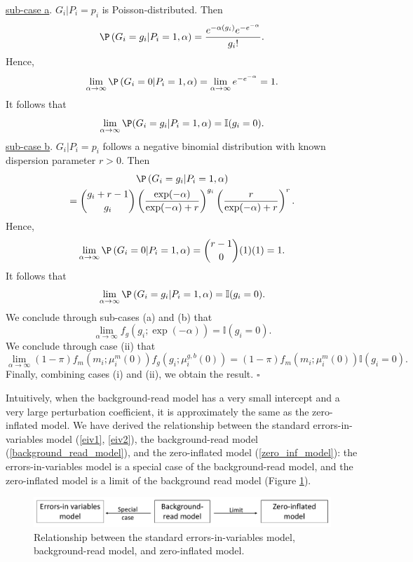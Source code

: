 \documentclass[12pt]{article}
\begin{document}
\underline{sub-case a}. $G_i | P_i = p_i$ is Poisson-distributed. Then
$$ \P\left( G_i = g_i | P_i = 1, \alpha \right) = \frac{ e^{ -\alpha (g_i) }e^{-e^{-\alpha}} }{ g_i! }.$$ Hence,
$$ \lim_{\alpha \to \infty} \P\left( G_i = 0 | P_i = 1, \alpha \right) = \lim_{\alpha \to \infty} e^{ -e^{-\alpha}} = 1.$$ It follows that
$$ \lim_{\alpha \to \infty} \P( G_i = g_i | P_i = 1, \alpha ) = \mathbb{I}(g_i = 0).$$
\underline{sub-case b}. $G_i | P_i = p_i$ follows a negative binomial distribution with known dispersion parameter $r > 0$. Then
\begin{multline*} \P \left( G_i = g_i | P_i = 1, \alpha \right) \\ = \binom{g_i + r - 1}{g_i} \left(\frac{\exp(-\alpha)}{\exp(-\alpha) + r} \right)^{g_i} \left(\frac{r}{\exp(-\alpha) + r} \right)^r. 
\end{multline*} Hence,
$$
\lim_{\alpha \to \infty} \P \left( G_i = 0 | P_i = 1, \alpha \right) = \binom{r - 1}{0} (1)(1) = 1.
$$
It follows that
$$ \lim_{\alpha \to \infty} \P \left( G_i = g_i | P_i = 1,\alpha \right) = \mathbb{I}(g_i = 0).$$
We conclude through sub-cases (a) and (b) that 
$$ \lim_{\alpha \to \infty} f_g(g_i; \exp(-\alpha)) = \mathbb{I}(g_i = 0).$$ We conclude through case (ii) that
$$ \lim_{\alpha \to \infty} (1-\pi) f_m( m_i; \mu_i^m(0)) f_g(g_i; \mu_i^{g,b}(0)) = (1-\pi) f_m(m_i; \mu_i^m(0)) \mathbb{I}(g_i = 0).$$ Finally, combining cases (i) and (ii), we obtain the result. $\square$

Intuitively, when the background-read model has a very small intercept and a very large perturbation coefficient, it is approximately the same as the zero-inflated model. We have derived the relationship between the standard errors-in-variables model (\ref{eiv1}, \ref{eiv2}), the background-read model (\ref{background_read_model}), and the zero-inflated model (\ref{zero_inf_model}): the errors-in-variables model is a special case of the background-read model, and the zero-inflated model is a limit of the background read model (Figure \ref{fig1}).

\begin{figure}
	\centering
	\includegraphics[width=1\linewidth]{fig1_crop}
	\caption{Relationship between the standard errors-in-variables model, background-read model, and zero-inflated model.}
	\label{fig1}
\end{figure}
\end{document}
